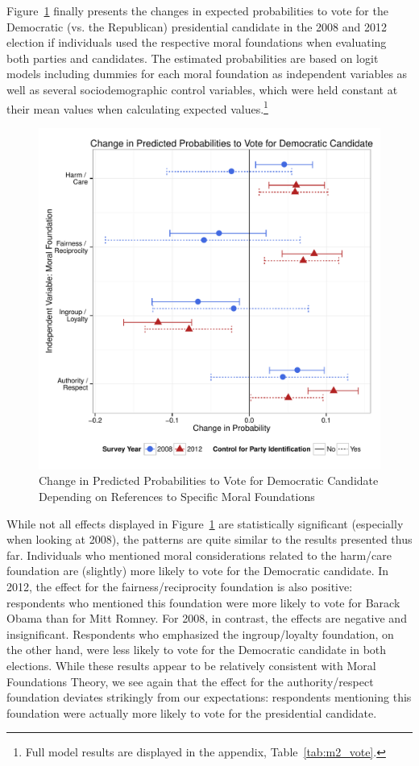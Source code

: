 \documentclass[12pt]{article}
\begin{document}
Figure~\ref{fig:m2_vote} finally presents the changes in expected probabilities to vote for the Democratic (vs. the Republican) presidential candidate in the 2008 and 2012 election if individuals used the respective moral foundations when evaluating both parties and candidates. The estimated probabilities are based on logit models including dummies for each moral foundation as independent variables as well as several sociodemographic control variables, which were held constant at their mean values when calculating expected values.\footnote{Full model results are displayed in the appendix, Table~\ref{tab:m2_vote}.}

\begin{figure}[ht]\centering
\includegraphics[scale=.5]{../calc/fig/m2_vote.pdf}
\caption{Change in Predicted Probabilities to Vote for Democratic Candidate Depending on References to Specific Moral Foundations}\label{fig:m2_vote}
\end{figure}

While not all effects displayed in Figure~\ref{fig:m2_vote} are statistically significant (especially when looking at 2008), the patterns are quite similar to the results presented thus far. Individuals who mentioned moral considerations related to the harm/care foundation are (slightly) more likely to vote for the Democratic candidate. In 2012, the effect for the fairness/reciprocity foundation is also positive: respondents who mentioned this foundation were more likely to vote for Barack Obama than for Mitt Romney. For 2008, in contrast, the effects are negative and insignificant. Respondents who emphasized the ingroup/loyalty foundation, on the other hand, were less likely to vote for the Democratic candidate in both elections. While these results appear to be relatively consistent with Moral Foundations Theory, we see again that the effect for the authority/respect foundation deviates strikingly from our expectations: respondents mentioning this foundation were actually more likely to vote for the presidential candidate. 
\end{document}
